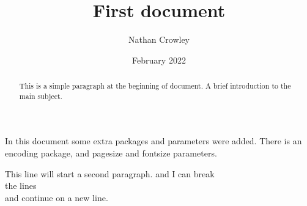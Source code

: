 \documentclass[12pt, letterpaper, twoside]{article}
\title{First document}
\author{Nathan Crowley}
\date{February 2022}
\begin{document}
\begin{titlepage}
\maketitle
\end{titlepage}

\begin{comment}
This is a multi-line comment.
\end{comment}

\begin{abstract}
This is a simple paragraph at the beginning of document. A brief introduction to the main subject.
\end{abstract}

In this document some extra packages and parameters were added. There is an encoding package, and pagesize and fontsize parameters.

This line will start a second paragraph. and I can break\\ the lines \\ and continue on a new line.
\end{document}
